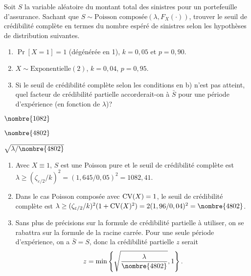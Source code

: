 \begin{exercice}
  Soit $S$ la variable aléatoire du montant total des sinistres pour
  un portefeuille d'assurance. Sachant que $S \sim \text{Poisson
    composée}(\lambda, F_X(\cdot))$, trouver le seuil de crédibilité
  complète en termes du nombre espéré de sinistres selon les
  hypothèses de distribution suivantes.
  \begin{enumerate}
  \item $\Pr[X = 1] = 1$ (dégénérée en 1), $k = 0,05$ et $p = 0,90$.
  \item $X \sim \text{Exponentielle}(2)$, $k = 0,04$, $p = 0,95$.
  \item Si le seuil de crédibilité complète selon les conditions en b)
    n'est pas atteint, quel facteur de crédibilité partielle
    accorderait-on à $\bar{S}$ pour une période d'expérience (en
    fonction de $\lambda$)?
  \end{enumerate}
  \begin{rep}
    \begin{inparaenum}
    \item $\nombre{1082}$
    \item $\nombre{4802}$
    \item $\sqrt{\lambda/\nombre{4802}}$
    \end{inparaenum}
  \end{rep}
  \begin{sol}
    \begin{enumerate}
    \item Avec $X \equiv 1$, $S$ est une Poisson pure et le seuil de
      crédibilité complète est $\lambda \geq
      (\zeta_{\varepsilon/2}/k)^2 = (1,645/0,05)^2 = 1082,41$.
    \item Dans le cas Poisson composée avec $\operatorname{CV}(X) = 1$, le
      seuil de crédibilité complète est $\lambda \geq
      (\zeta_{\varepsilon/2}/k)^2 (1 + \CV(X)^2) = 2
      (1,96/0,04)^2 = \nombre{4802}$.
    \item Sans plus de précisions sur la formule de crédibilité
      partielle à utiliser, on se rabattra sur la formule de la racine
      carrée. Pour une seule période d'expérience, on a $\bar{S} = S$,
      donc la crédibilité partielle $z$ serait
      \begin{displaymath}
        z = \min
        \left\{
          \sqrt{\frac{\lambda}{\nombre{4802}}}, 1
        \right\}.
      \end{displaymath}
    \end{enumerate}
  \end{sol}
\end{exercice}

